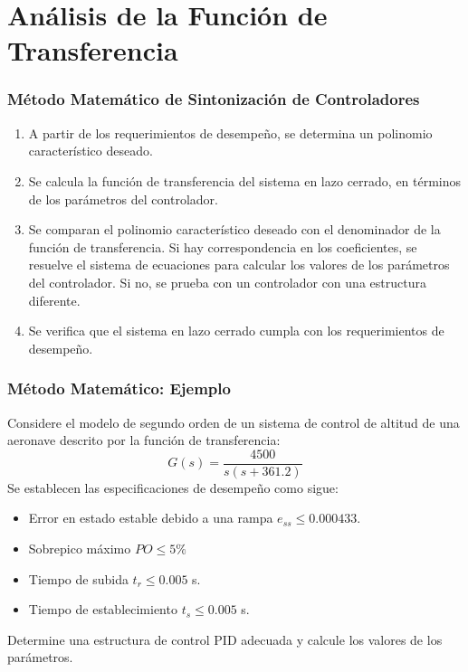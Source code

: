 \documentclass[aspectratio=169]{beamer}
\theoremstyle{definition}
\theoremstyle{plain}
\theoremstyle{remark}
\begin{document}
\section{Análisis de la Función de Transferencia}
\begin{frame}[<+->]\frametitle{Método Matemático de Sintonización de Controladores}
\begin{enumerate}
	\item A partir de los requerimientos de desempeño, se determina un polinomio característico deseado.
	\item Se calcula la función de transferencia del sistema en lazo cerrado, en términos de los parámetros del controlador.
	\item Se comparan el polinomio característico deseado con el denominador de la función de transferencia. Si hay correspondencia en los coeficientes, se resuelve el sistema de ecuaciones para calcular los valores de los parámetros del controlador. Si no, se prueba con un controlador con una estructura diferente.
	\item Se verifica que el sistema en lazo cerrado cumpla con los requerimientos de desempeño.
\end{enumerate}
\end{frame}

\begin{frame}[c]\frametitle{Método Matemático: Ejemplo}
Considere el modelo de segundo orden de un sistema de control de altitud de una aeronave descrito por la función de transferencia:
\begin{equation*}
	G(s) = \frac{4500}{s(s+361.2)}
\end{equation*}
Se establecen las especificaciones de desempeño como sigue:
\begin{itemize}
	\item Error en estado estable debido a una rampa $e_{ss} \leq 0.000433$.
	\item Sobrepico máximo $PO \leq 5\%$
	\item Tiempo de subida $t_r \leq 0.005$ s.
	\item Tiempo de establecimiento $t_s \leq 0.005$ s.
\end{itemize}
Determine una estructura de control PID adecuada y calcule los valores de los parámetros.
\end{frame}
\end{document}
